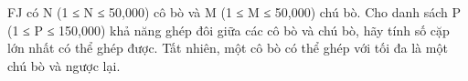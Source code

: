 FJ có N (1 ≤ N ≤ 50,000) cô bò và M (1 ≤ M ≤ 50,000) chú bò. Cho danh sách P (1 ≤ P ≤ 150,000) khả năng ghép đôi giữa các cô bò và chú bò, hãy tính số cặp lớn nhất có thể ghép được. Tất nhiên, một cô bò có thể ghép với tối đa là một chú bò và ngược lại.